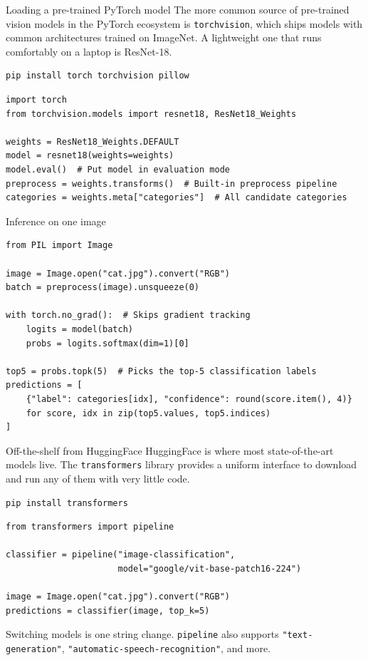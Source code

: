\documentclass[aspectratio=169]{beamer}
\begin{document}
\begin{frame}[fragile]{Loading a pre-trained PyTorch model}
    The more common source of pre-trained vision models in the PyTorch ecosystem is \texttt{torchvision}, which ships models with common architectures trained on ImageNet.
    A lightweight one that runs comfortably on a laptop is ResNet-18.

    \begin{verbatim}
pip install torch torchvision pillow
    \end{verbatim}

    \begin{verbatim}
import torch
from torchvision.models import resnet18, ResNet18_Weights

weights = ResNet18_Weights.DEFAULT
model = resnet18(weights=weights)
model.eval()  # Put model in evaluation mode
preprocess = weights.transforms()  # Built-in preprocess pipeline
categories = weights.meta["categories"]  # All candidate categories
    \end{verbatim}
\end{frame}

\begin{frame}[fragile]{Inference on one image}
    \begin{verbatim}
from PIL import Image

image = Image.open("cat.jpg").convert("RGB")
batch = preprocess(image).unsqueeze(0)

with torch.no_grad():  # Skips gradient tracking
    logits = model(batch)
    probs = logits.softmax(dim=1)[0]

top5 = probs.topk(5)  # Picks the top-5 classification labels
predictions = [
    {"label": categories[idx], "confidence": round(score.item(), 4)}
    for score, idx in zip(top5.values, top5.indices)
]
    \end{verbatim}
\end{frame}

\begin{frame}[fragile]{Off-the-shelf from HuggingFace}
    HuggingFace is where most state-of-the-art models live.
    The \texttt{transformers} library provides a uniform interface to download and run any of them with very little code.

    \begin{verbatim}
pip install transformers
    \end{verbatim}

    \begin{verbatim}
from transformers import pipeline

classifier = pipeline("image-classification",
                      model="google/vit-base-patch16-224")

image = Image.open("cat.jpg").convert("RGB")
predictions = classifier(image, top_k=5)
    \end{verbatim}

    Switching models is one string change.
    \texttt{pipeline} also supports \texttt{"text-generation"}, \texttt{"automatic-speech-recognition"}, and more.
\end{frame}
\end{document}
